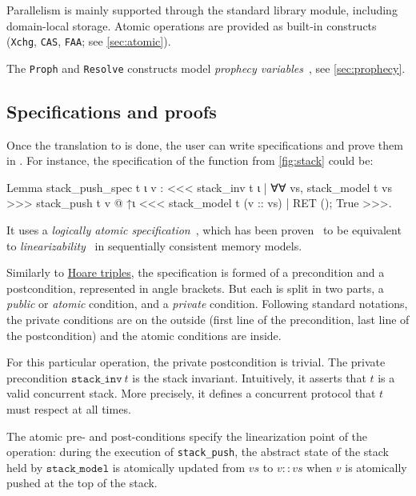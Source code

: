 Parallelism is mainly supported through the  standard library module, including domain-local storage. Atomic operations are provided as built-in constructs (\texttt{Xchg}, \texttt{CAS}, \texttt{FAA}; see \cref{sec:atomic}).

The \texttt{Proph} and \texttt{Resolve} constructs model \emph{prophecy variables}~\citep*{DBLP:journals/pacmpl/JungLPRTDJ20}, see \cref{sec:prophecy}.

\subsection{Specifications and proofs}
\label{subsec:stack-specs-and-proofs}

Once the translation to \ZooLang is done, the user can write specifications and prove them in \Iris.
For instance, the specification of the  function from \cref{fig:stack} could be:

\begin{coqcode}
Lemma stack_push_spec t ι v :
  <<< stack_inv t ι
    | ∀∀ vs, stack_model t vs >>>
    stack_push t v @ ↑ι
  <<< stack_model t (v :: vs)
    | RET (); True >>>.
\end{coqcode}

It uses a \emph{logically atomic specification}~\citep*{DBLP:conf/ecoop/PintoDG14}, which has been proven~\citep*{DBLP:journals/pacmpl/BirkedalDGJST21} to be equivalent to \emph{linearizability}~\citep*{DBLP:journals/toplas/HerlihyW90} in sequentially consistent memory models.

Similarly to \href{https://en.wikipedia.org/wiki/Hoare_logic}{Hoare triples},
the specification is formed of a precondition and a postcondition, represented in angle brackets.
But each is split in two parts, a \emph{public} or \emph{atomic} condition, and a \emph{private} condition.
Following standard \Iris notations, the private conditions are on the outside (first line of the precondition, last line of the postcondition) and the atomic conditions are inside.

For this particular operation, the private postcondition is trivial.
The private precondition $\mathtt{stack\_inv}\ t$ is the stack invariant.
Intuitively, it asserts that $t$ is a valid concurrent stack.
More precisely, it defines a concurrent protocol that $t$ must respect at all times.

The atomic pre- and post-conditions specify the linearization point of the operation: during the execution of \texttt{stack\_push}, the abstract state of the stack held by $\mathtt{stack\_model}$ is atomically updated from $\mathit{vs}$ to $\mathit{v} :: \mathit{vs}$ when $\mathit{v}$ is atomically pushed at the top of the stack.

